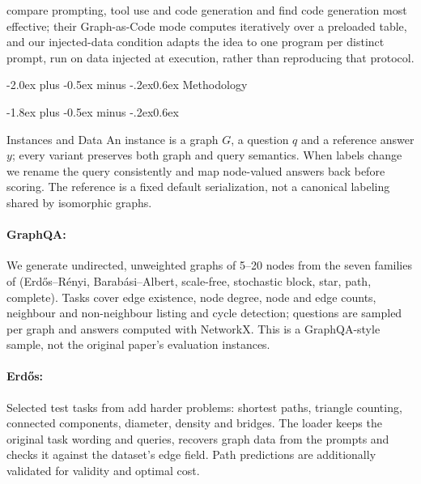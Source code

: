 \documentclass[11pt]{article}
\makeatletter
\renewcommand\section{\@startsection{section}{1}{\z@}
  {-2.0ex plus -0.5ex minus -.2ex}{0.6ex}
  {\large\bfseries\centering}}
\renewcommand\subsection{\@startsection{subsection}{2}{\z@}
  {-1.8ex plus -0.5ex minus -.2ex}{0.6ex}
  {\normalsize\bfseries\raggedright}}
\makeatother
\begin{document}
\citet{finkelshtein} compare prompting, tool use and code generation and find code
generation most effective; their Graph-as-Code mode computes iteratively over a
preloaded table, and our injected-data condition adapts the idea to one program per
distinct prompt, run on data injected at execution, rather than reproducing that
protocol.

\section{Methodology}
\label{sec:methodology}

\subsection{Instances and Data}
An instance is a graph $G$, a question $q$ and a reference answer $y$; every
variant preserves both graph and query semantics. When labels change we rename the
query consistently and map node-valued answers back before scoring. The reference is
a fixed default serialization, not a canonical labeling shared by isomorphic graphs.

\paragraph{GraphQA:}
We generate undirected, unweighted graphs of 5--20 nodes from the seven families
of \citet{fatemi} (Erd\H{o}s--R\'enyi, Barab\'asi--Albert, scale-free, stochastic
block, star, path, complete). Tasks cover edge existence, node degree, node and edge
counts, neighbour and non-neighbour listing and cycle detection; questions are
sampled per graph and answers computed with NetworkX. This is a GraphQA-style
sample, not the original paper's evaluation instances.

\paragraph{Erd\H{o}s:}
Selected test tasks from \citet{guo} add harder problems: shortest paths, triangle
counting, connected components, diameter, density and bridges. The loader keeps the
original task wording and queries, recovers graph data from the prompts and checks
it against the dataset's edge field. Path predictions are additionally validated for
validity and optimal cost.
\end{document}
